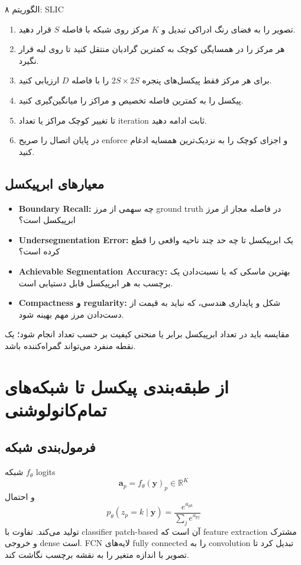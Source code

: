 \documentclass[12pt,openany,oneside]{book}
\newcommand{\R}{\mathbb{R}}
\newcommand{\vect}[1]{\bm{#1}}
\begin{document}
\begin{algorithmbox}{الگوریتم ۸: SLIC}
\begin{enumerate}
\item تصویر را به فضای رنگ ادراکی تبدیل و \(K\) مرکز روی شبکه با فاصله \(S\) قرار دهید.
\item هر مرکز را در همسایگی کوچک به کمترین گرادیان منتقل کنید تا روی لبه قرار نگیرد.
\item برای هر مرکز فقط پیکسل‌های پنجره \(2S\times2S\) را با فاصله \(D\) ارزیابی کنید.
\item پیکسل را به کمترین فاصله تخصیص و مراکز را میانگین‌گیری کنید.
\item تا تغییر کوچک مراکز یا تعداد iteration ثابت ادامه دهید.
\item در پایان اتصال را صریح enforce و اجزای کوچک را به نزدیک‌ترین همسایه ادغام کنید.
\end{enumerate}
\end{algorithmbox}

\subsection{معیارهای ابرپیکسل}
\begin{itemize}
\item \textbf{Boundary Recall:} چه سهمی از مرز ground truth در فاصله مجاز از مرز ابرپیکسل است؟
\item \textbf{Undersegmentation Error:} یک ابرپیکسل تا چه حد چند ناحیه واقعی را قطع کرده است؟
\item \textbf{Achievable Segmentation Accuracy:} بهترین ماسکی که با نسبت‌دادن یک برچسب به هر ابرپیکسل قابل دستیابی است.
\item \textbf{Compactness و regularity:} شکل و پایداری هندسی، که نباید به قیمت از دست‌دادن مرز مهم بهینه شود.
\end{itemize}
مقایسه باید در تعداد ابرپیکسل برابر یا منحنی کیفیت بر حسب تعداد انجام شود؛ یک نقطه منفرد می‌تواند گمراه‌کننده باشد.

\section{از طبقه‌بندی پیکسل تا شبکه‌های تمام‌کانولوشنی}
\subsection{فرمول‌بندی شبکه}
شبکه \(f_\theta\) logits
\[
\vect a_p=f_\theta(\vect y)_p\in\R^K
\]
و احتمال
\[
p_\theta(z_p=k\mid\vect y)=\frac{e^{a_{pk}}}{\sum_j e^{a_{pj}}}
\]
تولید می‌کند. تفاوت با classifier patch-based آن است که feature extraction مشترک و خروجی dense است. FCN لایه‌های
fully connected را به convolution تبدیل کرد تا تصویر با اندازه متغیر را به نقشه برچسب نگاشت کند.
\end{document}
